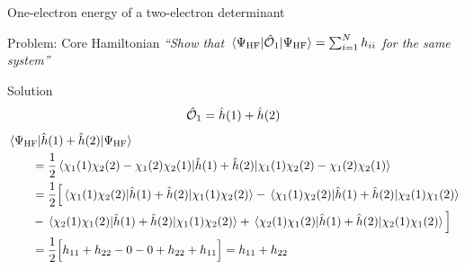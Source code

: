 \documentclass[aspectratio=169,9pt]{beamer}
\newcommand{\hh}{\Hat{h}}
\newcommand{\chO}{\Hat{\mathcal{O}}}
\newcommand{\violet}[1]{\textcolor{hfViolet}{#1}}
\begin{document}
\begin{frame}{One-electron energy of a two-electron determinant}
	\begin{block}{Problem: Core Hamiltonian}
		\textit{\violet{``Show that $ \mel{\Psi_\text{HF}}{\chO_1}{\Psi_\text{HF}}  = \sum_{i=1}^N h_{ii}  $ for the same system''}}
	\end{block}
	\pause
	\begin{block}{Solution}
		\small
		\begin{equation*}
			\chO_1 = \hh(1) + \hh(2)
		\end{equation*}
		\begin{equation*}
		\begin{split}
			& \mel{ \Psi_\text{HF} }{ \hh(1) + \hh(2) }{ \Psi_\text{HF} } 
			\\
			& \qquad = \frac{1}{2} \mel{ \chi_1(1) \chi_2(2) -  \chi_1(2) \chi_2(1) }{ \hh(1) + \hh(2) }{ \chi_1(1) \chi_2(2) -  \chi_1(2) \chi_2(1) }
			\\
			&  \qquad = \frac{1}{2} \Big[ 
			\mel{ \chi_1(1) \chi_2(2) }{ \hh(1) + \hh(2) }{ \chi_1(1) \chi_2(2) }
			- \mel{ \chi_1(1) \chi_2(2) }{ \hh(1) + \hh(2) }{ \chi_2(1) \chi_1(2) }
			\\
			&  \qquad - \mel{  \chi_2(1) \chi_1(2) }{ \hh(1) + \hh(2) }{ \chi_1(1) \chi_2(2)  }
			+ \mel{  \chi_2(1) \chi_1(2) }{ \hh(1) + \hh(2) }{  \chi_2(1) \chi_1(2) }
			\Big]
			\\
			&  \qquad =  \frac{1}{2} \Big[ h_{11} + h_{22} - 0 - 0 + h_{22} + h_{11} \Big] = h_{11} + h_{22}
		\end{split}
		\end{equation*}
	\end{block}
\end{frame}
\end{document}
